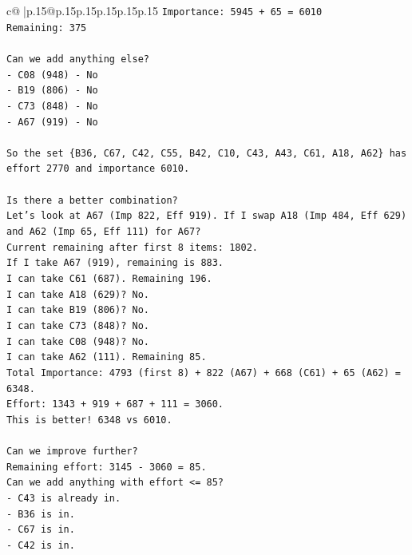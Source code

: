 \documentclass{article}
\begin{document}
{\begin{supertabular}{c@{$\;$}|p{.15\linewidth}@{}p{.15\linewidth}p{.15\linewidth}p{.15\linewidth}p{.15\linewidth}p{.15\linewidth}}
{{{\texttt{Importance: 5945 + 65 = 6010} \\
\texttt{Remaining: 375} \\
\\ 
\texttt{Can we add anything else?} \\
\texttt{{-} C08 (948) {-} No} \\
\texttt{{-} B19 (806) {-} No} \\
\texttt{{-} C73 (848) {-} No} \\
\texttt{{-} A67 (919) {-} No} \\
\\ 
\texttt{So the set \{B36, C67, C42, C55, B42, C10, C43, A43, C61, A18, A62\} has effort 2770 and importance 6010.} \\
\\ 
\texttt{Is there a better combination?} \\
\texttt{Let's look at A67 (Imp 822, Eff 919). If I swap A18 (Imp 484, Eff 629) and A62 (Imp 65, Eff 111) for A67?} \\
\texttt{Current remaining after first 8 items: 1802.} \\
\texttt{If I take A67 (919), remaining is 883.} \\
\texttt{I can take C61 (687). Remaining 196.} \\
\texttt{I can take A18 (629)? No.} \\
\texttt{I can take B19 (806)? No.} \\
\texttt{I can take C73 (848)? No.} \\
\texttt{I can take C08 (948)? No.} \\
\texttt{I can take A62 (111). Remaining 85.} \\
\texttt{Total Importance: 4793 (first 8) + 822 (A67) + 668 (C61) + 65 (A62) = 6348.} \\
\texttt{Effort: 1343 + 919 + 687 + 111 = 3060.} \\
\texttt{This is better! 6348 vs 6010.} \\
\\ 
\texttt{Can we improve further?} \\
\texttt{Remaining effort: 3145 {-} 3060 = 85.} \\
\texttt{Can we add anything with effort <= 85?} \\
\texttt{{-} C43 is already in.} \\
\texttt{{-} B36 is in.} \\
\texttt{{-} C67 is in.} \\
\texttt{{-} C42 is in.} \\
}}}
\end{supertabular}}
\end{document}
